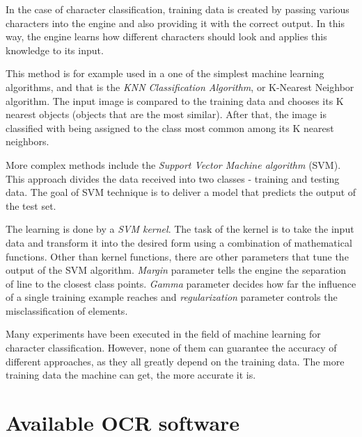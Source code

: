 In the case of character classification, training data is created by passing various characters into the engine and also providing it with the correct output. In this way, the engine learns how different characters should look and applies this knowledge to its input.

This method is for example used in a one of the simplest machine learning algorithms, and that is the \emph{KNN Classification Algorithm}, or K-Nearest Neighbor algorithm. The input image is compared to the training data and chooses its K nearest objects (objects that are the most similar). After that, the image is classified with being assigned to the class most common among its K nearest neighbors.

More complex methods include the \emph{Support Vector Machine algorithm} (SVM). This approach divides the data received into two classes - training and testing data. The goal of SVM technique is to deliver a model that predicts the output of the test set.

The learning is done by a \emph{SVM kernel}. The task of the kernel is to take the input data and transform it into the desired form using a combination of mathematical functions. Other than kernel functions, there are other parameters that tune the output of the SVM algorithm. \emph{Margin} parameter tells the engine the separation of line to the closest class points. \emph{Gamma} parameter decides how far the influence of a single training example reaches and \emph{regularization} parameter controls the misclassification of elements.

Many experiments have been executed in the field of machine learning for character classification. However, none of them can guarantee the accuracy of different approaches, as they all greatly depend on the training data. The more training data the machine can get, the more accurate it is. 

\section{Available OCR software}


